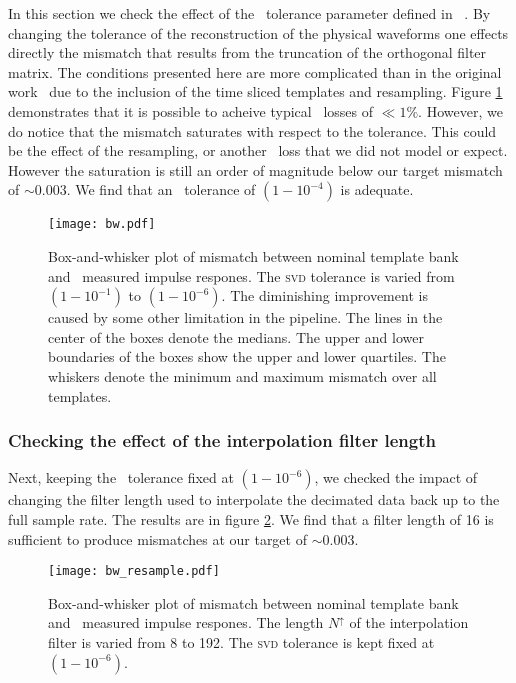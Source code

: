 In this section we check the effect of the \SVD\ tolerance parameter defined in
~\cite{Cannon:2010p10398}.  By changing the tolerance of the reconstruction of
the physical waveforms one effects directly the mismatch that results from the
truncation of the orthogonal filter matrix.  The conditions presented here are
more complicated than in the original work~\cite{Cannon:2010p10398} due to the
inclusion of the time sliced templates and resampling.    Figure \ref{fig:hist-svd-tolerance}
demonstrates that it is possible to acheive typical \SNR\ losses of $\ll1\%$.
However, we do notice that the mismatch saturates with respect to the tolerance.
This could be the effect of the resampling, or another \SNR\ loss that we did
not model or expect.  However the saturation is still an order of magnitude below our target mismatch of $\sim 0.003$.  We find that an \SVD\ tolerance of
$\left(1-10^{-4}\right)$ is adequate. 
%
\begin{figure}
	\begin{center}
		\texttt{[image: bw.pdf]}
		\caption{\label{fig:hist-svd-tolerance}
Box-and-whisker plot of mismatch between nominal
template bank and \lloid\ measured impulse respones.  The \textsc{svd}
tolerance is varied from $\left(1-10^{-1}\right)$ to $\left(1-10^{-6}\right)$.
The diminishing improvement is caused by some other limitation in the pipeline.
The lines in the
center of the boxes denote the medians.  The upper and lower boundaries of the
boxes show the upper and lower quartiles.  The whiskers denote the minimum and
maximum mismatch over all templates.}
	\end{center}
\end{figure}

\subsubsection{Checking the effect of the interpolation filter length}

Next, keeping the \SVD\ tolerance fixed at $\left(1-10^{-6}\right)$, we checked the
impact of changing the filter length used to interpolate the decimated data
back up to the full sample rate.  The results are in figure
\ref{fig:hist-interpolate}.  We find that a filter length of 16 is sufficient
to produce mismatches at our target of $\sim 0.003$.
%
\begin{figure}
	\begin{center}
		\texttt{[image: bw\_resample.pdf]}
		\caption{\label{fig:hist-interpolate} Box-and-whisker plot of
mismatch between nominal template bank and \lloid\ measured impulse respones.
The length $N^\uparrow$ of the interpolation filter is varied from 8 to 192.
The \textsc{svd} tolerance is kept fixed at $(1-10^{-6})$.}
	\end{center}
\end{figure}




